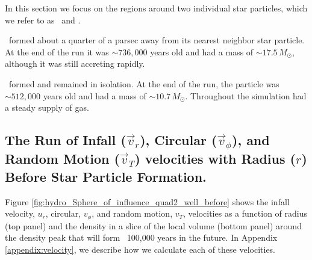 \documentclass[../dissertation.tex]{subfiles}
\begin{document}
In this section we focus on the regions around  two individual star 
particles, which we refer to as \partA\ and \partB.

\PartA\ formed about a quarter of a parsec away from its nearest neighbor star particle.
At the end of the run it was $\sim 736,000$ years old and had 
a mass of $\sim 17.5 \, M_\odot$, although it was still accreting rapidly.

\PartB\ formed and remained in isolation.
At the end of the run, the particle was $\sim 512,000$ years 
old and had a mass of $\sim 10.7 \, M_\odot$.
Throughout the simulation \partB had a steady supply of gas.

\subsection{The Run of Infall ($\vec{v}_r$), Circular ($\vec{v}_\phi$), and %
 Random Motion ($\vec{v}_T$) velocities with Radius ($r$) Before Star Particle Formation.}

Figure \ref{fig:hydro_Sphere_of_influence_quad2_well_before} shows the infall 
velocity, $u_r$, circular, $v_{\phi}$, and random motion, $v_T$, velocities as a function of  radius (top panel) and the density in a slice of the local volume 
(bottom panel) around the density peak that will form \partA\ 100,000 years in the future.   In Appendix \ref{appendix:velocity}, we describe how we calculate 
each of these velocities.
\end{document}
